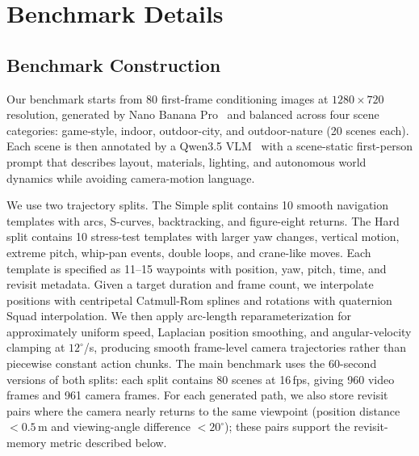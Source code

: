 \section{Benchmark Details}
\label{sec:appendix_benchmark}

\subsection{Benchmark Construction}
\label{sec:appendix_benchmark_construction}

Our benchmark starts from 80 first-frame conditioning images at $1280{\times}720$ resolution, generated by Nano Banana Pro~\citep{google2025nanobananapro} and balanced across four scene categories: game-style, indoor, outdoor-city, and outdoor-nature (20 scenes each).
Each scene is then annotated by a Qwen3.5 VLM~\citep{qwen3_5} with a scene-static first-person prompt that describes layout, materials, lighting, and autonomous world dynamics while avoiding camera-motion language.

\noindent We use two trajectory splits.
The Simple split contains 10 smooth navigation templates with arcs, S-curves, backtracking, and figure-eight returns.
The Hard split contains 10 stress-test templates with larger yaw changes, vertical motion, extreme pitch, whip-pan events, double loops, and crane-like moves.
Each template is specified as 11--15 waypoints with position, yaw, pitch, time, and revisit metadata.
Given a target duration and frame count, we interpolate positions with centripetal Catmull-Rom splines and rotations with quaternion Squad interpolation.
We then apply arc-length reparameterization for approximately uniform speed, Laplacian position smoothing, and angular-velocity clamping at $12^\circ$/s, producing smooth frame-level camera trajectories rather than piecewise constant action chunks.
The main benchmark uses the 60-second versions of both splits: each split contains 80 scenes at 16\,fps, giving 960 video frames and 961 \modelname camera frames.
For each generated path, we also store revisit pairs where the camera nearly returns to the same viewpoint (position distance $<0.5$\,m and viewing-angle difference $<20^\circ$); these pairs support the revisit-memory metric described below.

